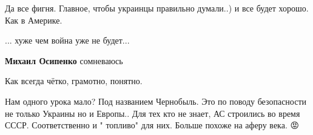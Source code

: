 \begin{itemize}
\begin{itemize}
 
Да все фигня. Главное, чтобы украинцы правильно думали..) и все будет хорошо. Как в Америке.

\end{itemize}

 
... хуже чем война уже не будет...

\begin{itemize}
 
\textbf{Михаил Осипенко} сомневаюсь
\end{itemize}

 
Как всегда чётко, грамотно, понятно.

 

Нам одного урока мало? Под названием Чернобыль. Это по поводу безопасности не
только Украины но и Европы.. Для тех кто не знает, АС строились во время СССР.
Соответственно и " топливо" для них. Больше похоже на аферу века. 😡


 


\end{itemize}

